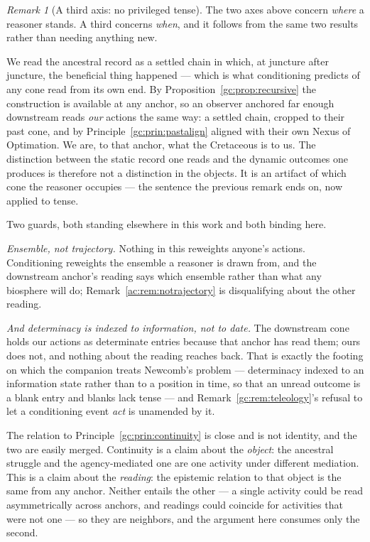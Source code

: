 \documentclass[11pt]{article}
\numberwithin{equation}{section}
\theoremstyle{plain}
\theoremstyle{definition}
\theoremstyle{remark}
\newtheorem{remark}[theorem]{Remark}
\begin{document}
\begin{remark}[A third axis: no privileged tense]\label{gc:rem:notense}
The two axes above concern \emph{where} a reasoner stands. A third
concerns \emph{when}, and it follows from the same two results rather
than needing anything new.

We read the ancestral record as a settled chain in which, at juncture
after juncture, the beneficial thing happened --- which is what
conditioning predicts of any cone read from its own end. By
Proposition~\ref{gc:prop:recursive} the construction is available at any
anchor, so an observer anchored far enough downstream reads \emph{our}
actions the same way: a settled chain, cropped to their past cone, and by
Principle~\ref{gc:prin:pastalign} aligned with their own Nexus of
Optimation. We are, to that anchor, what the Cretaceous is to us. The
distinction between the static record one reads and the dynamic outcomes
one produces is therefore not a distinction in the objects. It is an
artifact of which cone the reasoner occupies --- the sentence the
previous remark ends on, now applied to tense.

Two guards, both standing elsewhere in this work and both binding here.

\emph{Ensemble, not trajectory.} Nothing in this reweights anyone's
actions. Conditioning reweights the ensemble a reasoner is drawn from,
and the downstream anchor's reading says which ensemble rather than what
any biosphere will do; Remark~\ref{ac:rem:notrajectory} is disqualifying about
the other reading.

\emph{And determinacy is indexed to information, not to date.} The
downstream cone holds our actions as determinate entries because that
anchor has read them; ours does not, and nothing about the reading
reaches back. That is exactly the footing on which the companion treats
Newcomb's problem --- determinacy indexed to an information state rather
than to a position in time, so that an unread outcome is a blank entry
and blanks lack tense \cite{AethusDecision} --- and
Remark~\ref{gc:rem:teleology}'s refusal to let a conditioning event
\emph{act} is unamended by it.

The relation to Principle~\ref{gc:prin:continuity} is close and is not
identity, and the two are easily merged.
Continuity is a claim about the \emph{object}: the ancestral struggle and
the agency-mediated one are one activity under different mediation. This
is a claim about the \emph{reading}: the epistemic relation to that
object is the same from any anchor. Neither entails the other --- a
single activity could be read asymmetrically across anchors, and
readings could coincide for activities that were not one --- so they are
neighbors, and the argument here consumes only the second.
\end{remark}
\end{document}
